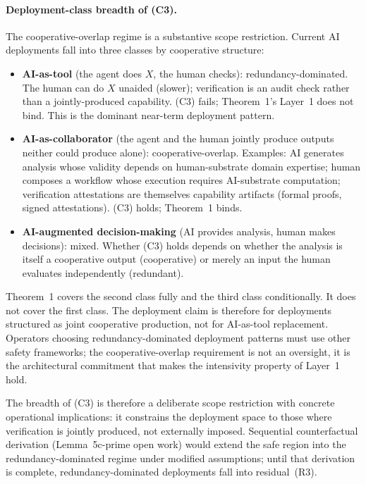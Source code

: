 \paragraph{Deployment-class breadth of (C3).}
The cooperative-overlap regime is a substantive scope restriction.
Current AI deployments fall into three classes by cooperative
structure:
\begin{itemize}
\item \textbf{AI-as-tool} (the agent does $X$, the human checks):
  redundancy-dominated.  The human can do $X$ unaided (slower);
  verification is an audit check rather than a jointly-produced
  capability.  (C3) fails; Theorem~1's Layer~1 does not bind.  This
  is the dominant near-term deployment pattern.
\item \textbf{AI-as-collaborator} (the agent and the human jointly
  produce outputs neither could produce alone): cooperative-overlap.
  Examples: AI generates analysis whose validity depends on
  human-substrate domain expertise; human composes a workflow
  whose execution requires AI-substrate computation; verification
  attestations are themselves capability artifacts (formal proofs,
  signed attestations).  (C3) holds; Theorem~1 binds.
\item \textbf{AI-augmented decision-making} (AI provides analysis,
  human makes decisions): mixed.  Whether (C3) holds depends on
  whether the analysis is itself a cooperative output (cooperative)
  or merely an input the human evaluates independently (redundant).
\end{itemize}
Theorem~1 covers the second class fully and the third class
conditionally.  It does not cover the first class.  The deployment
claim is therefore for deployments structured as joint cooperative
production, not for AI-as-tool replacement.  Operators choosing
redundancy-dominated deployment patterns must use other safety
frameworks; the cooperative-overlap requirement is not an
oversight, it is the architectural commitment that makes the
intensivity property of Layer~1 hold.

The breadth of (C3) is therefore a deliberate scope restriction
with concrete operational implications: it constrains the
deployment space to those where verification is jointly produced,
not externally imposed.  Sequential counterfactual derivation
(Lemma~5c-prime open work) would extend the safe region into the
redundancy-dominated regime under modified assumptions; until
that derivation is complete, redundancy-dominated deployments
fall into residual~(R3).

